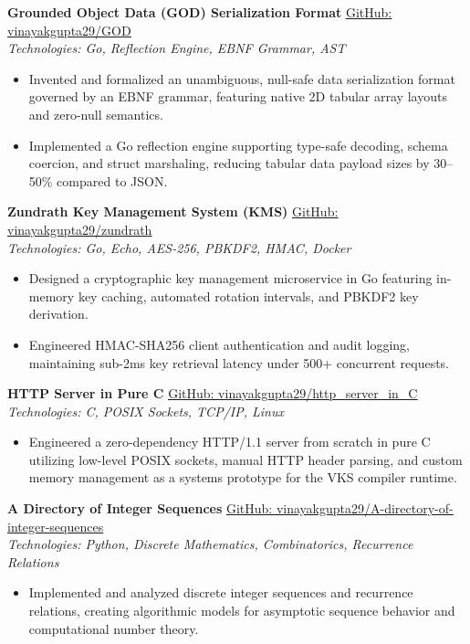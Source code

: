 \documentclass[10pt,a4paper]{article}
\begin{document}
\vspace{3pt}
\textbf{Grounded Object Data (GOD) Serialization Format} \hfill \href{https://github.com/vinayakgupta29/GOD}{\underline{GitHub: vinayakgupta29/GOD}} \\
\textit{Technologies: Go, Reflection Engine, EBNF Grammar, AST}
\begin{itemize}
  \item Invented and formalized an unambiguous, null-safe data serialization format governed by an EBNF grammar, featuring native 2D tabular array layouts and zero-null semantics.
  \item Implemented a Go reflection engine supporting type-safe decoding, schema coercion, and struct marshaling, reducing tabular data payload sizes by 30--50\% compared to JSON.
\end{itemize}

\vspace{3pt}
\textbf{Zundrath Key Management System (KMS)} \hfill \href{https://github.com/vinayakgupta29/zundrath}{\underline{GitHub: vinayakgupta29/zundrath}} \\
\textit{Technologies: Go, Echo, AES-256, PBKDF2, HMAC, Docker}
\begin{itemize}
  \item Designed a cryptographic key management microservice in Go featuring in-memory key caching, automated rotation intervals, and PBKDF2 key derivation.
  \item Engineered HMAC-SHA256 client authentication and audit logging, maintaining sub-2ms key retrieval latency under 500+ concurrent requests.
\end{itemize}

\vspace{3pt}
\textbf{HTTP Server in Pure C} \hfill \href{https://github.com/vinayakgupta29/http_server_in_C}{\underline{GitHub: vinayakgupta29/http_server_in_C}} \\
\textit{Technologies: C, POSIX Sockets, TCP/IP, Linux}
\begin{itemize}
  \item Engineered a zero-dependency HTTP/1.1 server from scratch in pure C utilizing low-level POSIX sockets, manual HTTP header parsing, and custom memory management as a systems prototype for the VKS compiler runtime.
\end{itemize}

\vspace{3pt}
\textbf{A Directory of Integer Sequences} \hfill \href{https://github.com/vinayakgupta29/A-directory-of-integer-sequences}{\underline{GitHub: vinayakgupta29/A-directory-of-integer-sequences}} \\
\textit{Technologies: Python, Discrete Mathematics, Combinatorics, Recurrence Relations}
\begin{itemize}
  \item Implemented and analyzed discrete integer sequences and recurrence relations, creating algorithmic models for asymptotic sequence behavior and computational number theory.
\end{itemize}
\end{document}

